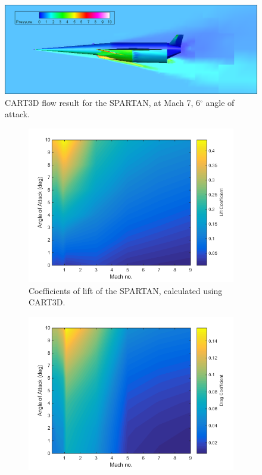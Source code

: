 		
		\begin{figure}
			\centering
			\includegraphics[width=0.9\linewidth]{figures/3_vehicle_design/M7AoA6}
			\caption{CART3D flow result for the SPARTAN, at Mach 7, 6$^\circ$ angle of attack.}
			\label{fig:M7AoA6}
		\end{figure}
		
		\begin{figure}
			\begin{subfigure}{.5\textwidth}
				\centering
				\includegraphics[width=0.99\linewidth]{figures/3_vehicle_design/Cl}
				\caption{Coefficients of lift of the SPARTAN, calculated using CART3D.}
				\label{fig:Cl}
			\end{subfigure}
			\begin{subfigure}{.5\textwidth}
				\centering
				\includegraphics[width=0.99\linewidth]{figures/3_vehicle_design/Cd}

\end{subfigure}
\end{figure}
